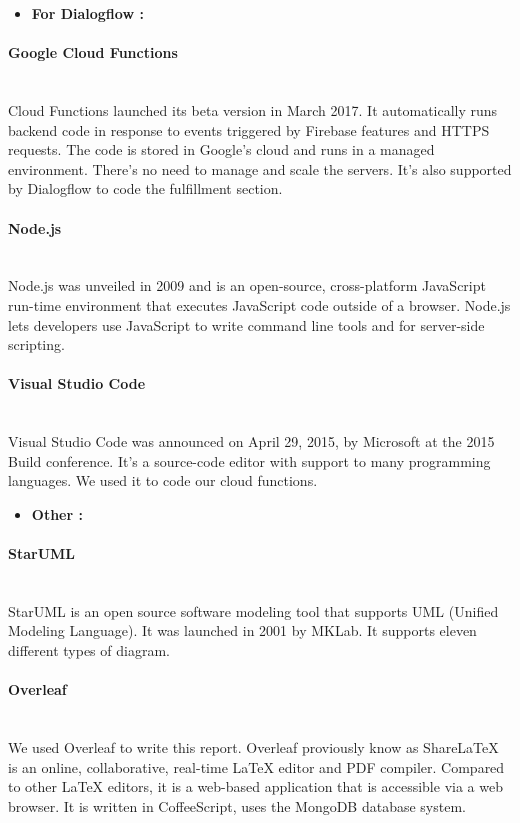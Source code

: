 \begin{itemize}
    \item \textbf{For Dialogflow :}
\end{itemize}
\paragraph{Google Cloud Functions}~\\
Cloud Functions launched its beta version in March 2017. It automatically runs backend code in response to events triggered by Firebase features and HTTPS requests. The code is stored in Google's cloud and runs in a managed environment. There's no need to manage and scale the servers\cite{17}. It's also supported by Dialogflow to code the fulfillment section.

\paragraph{Node.js}~\\
Node.js was unveiled in 2009 and is an open-source, cross-platform JavaScript run-time environment that executes JavaScript code outside of a browser. Node.js lets developers use JavaScript to write command line tools and for server-side scripting.

\paragraph{Visual Studio Code}~\\
Visual Studio Code was announced on April 29, 2015, by Microsoft at the 2015 Build conference. It's a source-code editor with support to many programming languages. We used it to code our cloud functions.

\begin{itemize}
    \item \textbf{Other :}
\end{itemize}
\paragraph{StarUML}~\\
StarUML is an open source software modeling tool that supports UML (Unified Modeling Language). It was launched in 2001 by MKLab. It supports eleven different types of diagram.

\paragraph{Overleaf}~\\
We used Overleaf to write this report. Overleaf proviously know as ShareLaTeX is an online, collaborative, real-time LaTeX editor and PDF compiler. Compared to other LaTeX editors, it is a web-based application that is accessible via a web browser. It is written in CoffeeScript, uses the MongoDB database system.


